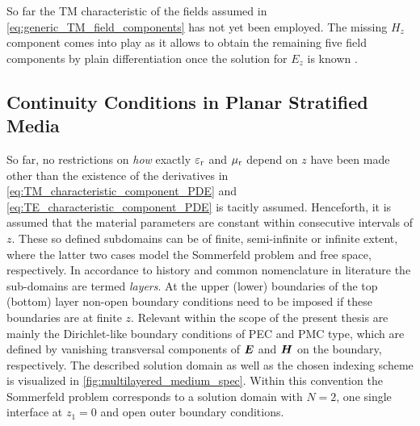 So far the \ac{TM} characteristic of the fields assumed in
\eqref{eq:generic_TM_field_components} has not yet been employed.
The missing $H_z$ component comes into play as it allows to obtain the
remaining five field components by plain differentiation once the solution for
$E_z$ is known \cite[\S\S2.3.3]{Chew1999}.







\subsection{Continuity Conditions in Planar Stratified Media}
\label{subsec:layered_media_and_continuity_conditions}

So far, no restrictions on \emph{how} exactly $\varepsilon_{\mathrm{r}}$ and $\mu_{\mathrm{r}}$ depend on $z$
have been made other than the existence of the derivatives in
\eqref{eq:TM_characteristic_component_PDE} and
\eqref{eq:TE_characteristic_component_PDE} is tacitly assumed.
Henceforth, it is assumed that the material parameters are constant within
consecutive intervals of $z$.
These so defined subdomains can be of finite, semi-infinite or infinite extent,
where the latter two cases model the Sommerfeld problem and free space,
respectively.
In accordance to history and common nomenclature in literature the sub-domains
are termed \emph{layers}.
At the upper (lower) boundaries of the top (bottom) layer non-open boundary
conditions  need to be imposed if these boundaries are at finite $z$.
Relevant within the scope of the present thesis are mainly the Dirichlet-like
boundary conditions of \ac{PEC} and \ac{PMC} type, which are defined by
vanishing transversal components of $\pvec{E}$ and $\pvec{H}$ on the boundary,
respectively.
The described solution domain as well as the chosen indexing scheme is
visualized in \cref{fig:multilayered_medium_spec}.
Within this convention the Sommerfeld problem corresponds to a solution domain
with $N=2$, one single interface at $z_1 = 0$ and open outer boundary
conditions.

